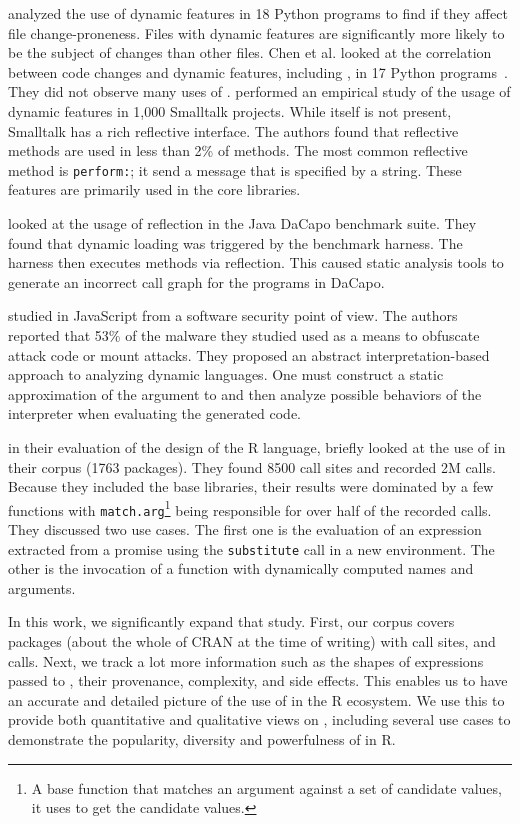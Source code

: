 \documentclass[acmsmall, screen]{acmart}
\renewcommand{\k}[1]{\lstinline |#1|\xspace}
\begin{document}
\citet{wang} analyzed the use of dynamic features in 18 Python programs to find if
they affect file change-proneness. Files with dynamic features are significantly
more likely to be the subject of changes than other files. Chen et al. looked
at the correlation between code changes and dynamic features, including \eval,
in 17 Python programs~\cite{chen}. They did not observe many uses of \eval.
\citet{oscar} performed an empirical study of the usage of dynamic features in
1,000 Smalltalk projects. While \eval itself is not present, Smalltalk has a
rich reflective interface. The authors found that reflective methods are used in less
than 2\% of methods. The most common reflective method is \k{perform:}; it send
a message that is specified by a string. These features are primarily used in the
core libraries.

\citet{bodden} looked at the usage of reflection in the Java DaCapo benchmark suite.
They found that dynamic loading was triggered by the benchmark harness. The
harness then executes methods via reflection. This caused static analysis tools
to generate an incorrect call graph for the programs in DaCapo.

\citet{Arceri21} studied \eval in JavaScript from a software security point of
view. The authors reported that 53\% of the malware they studied used \eval as a
means to obfuscate attack code or mount attacks. They proposed an abstract
interpretation-based approach to analyzing dynamic languages. One must construct
a static approximation of the argument to \eval and then analyze possible
behaviors of the interpreter when evaluating the generated code.

\citet{ecoop12} in their evaluation of the design of the R language, briefly
looked at the use of \eval in their corpus (1763 packages). They found 8500
\eval call sites and recorded 2M \eval calls. Because they included the base
libraries, their results were dominated by a few functions with
\k{match.arg}\footnote{A base function that matches an argument against a set of
candidate values, it uses \eval to get the candidate values.} being responsible
for over half of the recorded \eval calls. They discussed two use cases. The
first one is the evaluation of an expression extracted from a promise using the
\k{substitute} call in a new environment. The other is the invocation of a
function with dynamically computed names and arguments.

In this work, we significantly expand that study. First, our corpus covers
\CranPackages packages (about the whole of CRAN at the time of writing) with
\PkgHitEvalCallSites \eval call sites, and \packageAllcallsRnd \eval calls.
Next, we track a lot more information such as the shapes of expressions passed
to \eval, their provenance, complexity, and side effects. This enables us to
have an accurate and detailed picture of the use of \eval in the R ecosystem. We
use this to provide both quantitative and qualitative views on \eval, including
several use cases to demonstrate the popularity, diversity and powerfulness of
\eval in R.
\end{document}
